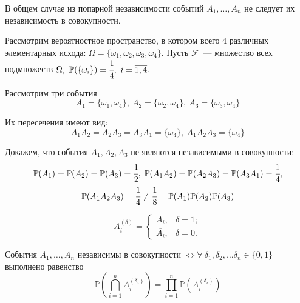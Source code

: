 \begin{rmrk}
    В общем случае из попарной независимости событий $A_1, \ldots, A_n$ не следует их независимость в совокупности.
    \begin{exmp}
        Рассмотрим вероятностное пространство, в котором всего 4 различных элементарных исхода: $\Omega = \{\omega_1, \omega_2, \omega_3, \omega_4 \}$. Пусть $\mathcal{F}$~--- множество всех подмножеств $\Omega,~{\mathbb{P}(\{\omega_i\})} = \cfrac{1}{4},~i = \overline{1,4}$.
        
        Рассмотрим три события 
        \begin{equation*}
            A_1 = \{\omega_1, \omega_4 \},~ 
            A_2 = \{\omega_2, \omega_4 \},~
            A_3 = \{\omega_3, \omega_4 \}
        \end{equation*}
        
        Их пересечения имеют вид:
        \begin{equation*}
            A_1A_2 = A_2A_3 = A_3A_1 = \{\omega_4 \},~
            A_1A_2A_3 = \{\omega_4 \}
        \end{equation*}
        
        Докажем, что события $A_1, A_2, A_3$ не являются независимыми в совокупности:
        \begin{gather*}
            {\mathbb{P}(A_1)} = {\mathbb{P}(A_2)} = {\mathbb{P}(A_3)} = \cfrac{1}{2}, \; {\mathbb{P}(A_1A_2)} = {\mathbb{P}(A_2A_3)} = {\mathbb{P}(A_3A_1)} = \cfrac{1}{4}, \\ {\mathbb{P}(A_1A_2A_3)} = \cfrac{1}{4} \neq \cfrac{1}{8} = {\mathbb{P}(A_1)}{\mathbb{P}(A_2)}{\mathbb{P}(A_3)}
        \end{gather*}
    \end{exmp}
\end{rmrk}

\begin{symb}
    \begin{equation*}
        A_{i}^{(\delta)} =
        \begin{cases}
            A_{i}, & \delta = 1; \\
            \overline{A_{i}}, & \delta = 0.
        \end{cases}
    \end{equation*}
\end{symb}

\begin{namedthm}
    События $A_1, \ldots, A_n$ независимы в совокупности $\Leftrightarrow \forall ~ \delta_1, \delta_2, \ldots \delta_n \in \{0, 1\}$ выполнено равенство
    \begin{equation*}
        \mathbb{P}\left( \bigcap_{i=1}^{n} A_{i}^{\left( \delta_{i} \right)} \right)
        = \prod_{i=1}^{n}\mathbb{P}\left( A_{i}^{\left(\delta_{i}\right)} \right)
    \end{equation*}
\end{namedthm}

